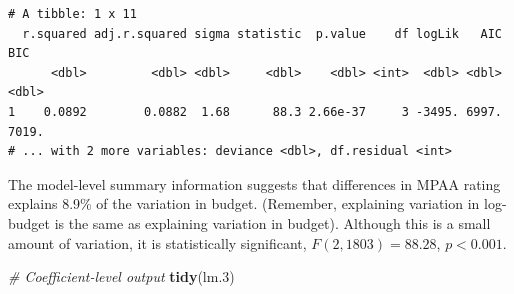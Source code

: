 \documentclass[]{book}
\newenvironment{Shaded}{\begin{snugshade}}{\end{snugshade}}
\newcommand{\CommentTok}[1]{\textcolor[rgb]{0.56,0.35,0.01}{\textit{#1}}}
\newcommand{\DataTypeTok}[1]{\textcolor[rgb]{0.13,0.29,0.53}{#1}}
\newcommand{\DecValTok}[1]{\textcolor[rgb]{0.00,0.00,0.81}{#1}}
\newcommand{\FloatTok}[1]{\textcolor[rgb]{0.00,0.00,0.81}{#1}}
\newcommand{\KeywordTok}[1]{\textcolor[rgb]{0.13,0.29,0.53}{\textbf{#1}}}
\newcommand{\NormalTok}[1]{#1}
\newcommand{\OperatorTok}[1]{\textcolor[rgb]{0.81,0.36,0.00}{\textbf{#1}}}
\newcommand{\StringTok}[1]{\textcolor[rgb]{0.31,0.60,0.02}{#1}}
\begin{document}
\begin{Shaded}
\end{Shaded}

\begin{verbatim}
# A tibble: 1 x 11
  r.squared adj.r.squared sigma statistic  p.value    df logLik   AIC   BIC
      <dbl>         <dbl> <dbl>     <dbl>    <dbl> <int>  <dbl> <dbl> <dbl>
1    0.0892        0.0882  1.68      88.3 2.66e-37     3 -3495. 6997. 7019.
# ... with 2 more variables: deviance <dbl>, df.residual <int>
\end{verbatim}

The model-level summary information suggests that differences in MPAA rating explains 8.9\% of the variation in budget. (Remember, explaining variation in log-budget is the same as explaining variation in budget). Although this is a small amount of variation, it is statistically significant, \(F(2,1803)=88.28\), \(p<0.001\).

\begin{Shaded}
\begin{Highlighting}[]
\CommentTok{# Coefficient-level output}
\KeywordTok{tidy}\NormalTok{(lm}\FloatTok{.3}\NormalTok{)}
\end{Highlighting}
\end{Shaded}
\end{document}
